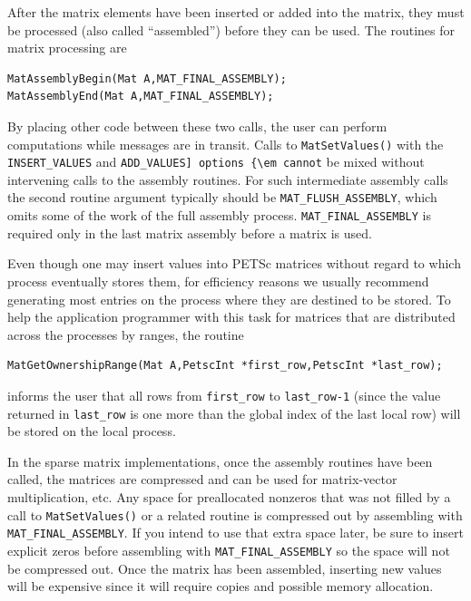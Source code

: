 After the matrix elements have been inserted or added into the matrix,
they must be processed (also called ``assembled'') before they can be used. The routines for matrix
processing are
\begin{lstlisting}
MatAssemblyBegin(Mat A,MAT_FINAL_ASSEMBLY);
MatAssemblyEnd(Mat A,MAT_FINAL_ASSEMBLY);
\end{lstlisting}
By placing other code between these two calls, the user can perform
computations while messages are in transit.
Calls to \lstinline{MatSetValues()} with the \lstinline{INSERT_VALUES} and
\lstinline{ADD_VALUES] options {\em cannot} be mixed without intervening calls to
the assembly routines.  For such intermediate assembly calls the
second routine argument  typically should be \lstinline{MAT_FLUSH_ASSEMBLY},
 which omits some of the work of the full
assembly process.  \lstinline{MAT_FINAL_ASSEMBLY}  is
required only in the last matrix assembly before a matrix is used.

Even though one may insert values into PETSc matrices without regard
to which process eventually stores them, for efficiency
reasons we usually recommend generating most entries on the
process where they are destined to be stored.  To help the
application programmer with this task for matrices that are
distributed across the processes by ranges, the routine
\begin{lstlisting}
MatGetOwnershipRange(Mat A,PetscInt *first_row,PetscInt *last_row);
\end{lstlisting}
informs the user that all rows from \lstinline{first_row} to
\lstinline{last_row-1} (since the value returned in \lstinline{last_row} is one more
than the global index of the last local row) will be stored on the local process.

In the sparse matrix implementations, once the assembly routines have been called, the matrices are compressed and can be used for matrix-vector multiplication, etc.
Any space for preallocated nonzeros that was not filled by a call to \lstinline{MatSetValues()} or a related routine is compressed out by assembling with \lstinline{MAT_FINAL_ASSEMBLY}.
If you intend to use that extra space later, be sure to insert explicit zeros before assembling with \lstinline{MAT_FINAL_ASSEMBLY} so the space will not be compressed out.
Once the matrix has been assembled, inserting new values will be expensive since it will require copies and possible memory allocation.

